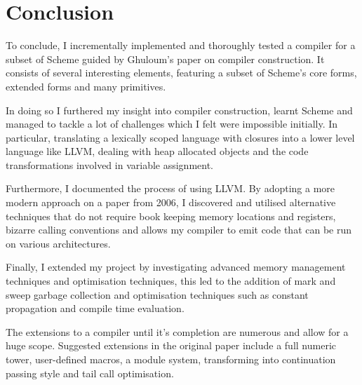\documentclass{article}
\begin{document}
\section{Conclusion}

To conclude, I incrementally implemented and thoroughly tested a compiler for a subset of Scheme guided by Ghuloum's paper on compiler construction. It consists of several interesting elements, featuring a subset of Scheme's core forms, extended forms and many primitives.

In doing so I furthered my insight into compiler construction, learnt Scheme and managed to tackle a lot of challenges which I felt were impossible initially. In particular, translating a lexically scoped language with closures into a lower level language like LLVM, dealing with heap allocated objects and the code transformations involved in variable assignment.

Furthermore, I documented the process of using LLVM. By adopting a more modern approach on a paper from 2006, I discovered and utilised alternative techniques that do not require book keeping memory locations and registers, bizarre calling conventions and allows my compiler to emit code that can be run on various architectures.

Finally, I extended my project by investigating advanced memory management techniques and optimisation techniques, this led to the addition of mark and sweep garbage collection and optimisation techniques such as constant propagation and compile time evaluation.

The extensions to a compiler until it's completion are numerous and allow for a huge scope. Suggested extensions in the original paper include a full numeric tower, user-defined macros, a module system, transforming into continuation passing style and tail call optimisation. 
\end{document}

